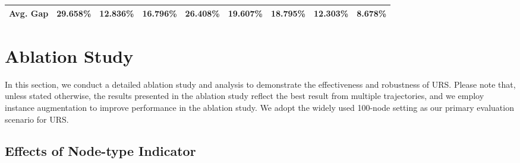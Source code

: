 \documentclass{article}
\theoremstyle{plain}
\theoremstyle{definition}
\theoremstyle{remark}
\begin{document}
\begin{table}[htbp]
\begin{center}
\begin{small}
{\begin{tabular}{cc|cccccccccccccccc}
\multicolumn{2}{c|}{Avg. Gap} & \multicolumn{2}{c}{29.658\%} & \multicolumn{2}{c}{12.836\%}       & \multicolumn{2}{c}{16.796\%} & \multicolumn{2}{c}{26.408\%} & \multicolumn{2}{c}{19.607\%}   & \multicolumn{2}{c}{18.795\%}        & \multicolumn{2}{c}{12.303\%}        & \multicolumn{2}{c}{\cellcolor[HTML]{D0CECE}\textbf{8.678\%}} \\ 
\bottomrule[0.5mm]
\end{tabular}
    
    }
  \end{small}
  \end{center}
\end{table}

\clearpage
\section{Ablation Study}
\label{append:ablation}
In this section, we conduct a detailed ablation study and analysis to demonstrate the effectiveness and robustness of URS. Please note that, unless stated otherwise, the results presented in the ablation study reflect the best result from multiple trajectories, and we employ instance augmentation to improve performance in the ablation study. We adopt the widely used 100-node setting as our primary evaluation scenario for URS.

\subsection{Effects of Node-type Indicator}
\label{append:ablation_nodetype}
\end{document}
